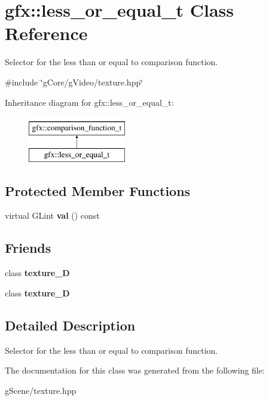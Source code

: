 \hypertarget{classgfx_1_1less__or__equal__t}{\section{gfx\-:\-:less\-\_\-or\-\_\-equal\-\_\-t Class Reference}
\label{classgfx_1_1less__or__equal__t}
}


Selector for the less than or equal to comparison function.  




{\ttfamily \#include \char`\"{}g\-Core/g\-Video/texture.\-hpp\char`\"{}}

Inheritance diagram for gfx\-:\-:less\-\_\-or\-\_\-equal\-\_\-t\-:\begin{figure}[H]
\begin{center}
\leavevmode
\includegraphics[height=2.000000cm]{classgfx_1_1less__or__equal__t}
\end{center}
\end{figure}
\subsection*{Protected Member Functions}
\begin{DoxyCompactItemize}
\item 
\hypertarget{classgfx_1_1less__or__equal__t_ab494c5a2a21f4d4777955e779447b058}{virtual G\-Lint {\bfseries val} () const }\label{classgfx_1_1less__or__equal__t_ab494c5a2a21f4d4777955e779447b058}

\end{DoxyCompactItemize}
\subsection*{Friends}
\begin{DoxyCompactItemize}
\item 
\hypertarget{classgfx_1_1less__or__equal__t_a2039d67f6166ccf823c78e3476aad9aa}{class {\bfseries texture\-\_\-D}}\label{classgfx_1_1less__or__equal__t_a2039d67f6166ccf823c78e3476aad9aa}

\item 
\hypertarget{classgfx_1_1less__or__equal__t_a22ad86ef46c3b17357a0cd59e50bc7dd}{class {\bfseries texture\-\_\-D}}\label{classgfx_1_1less__or__equal__t_a22ad86ef46c3b17357a0cd59e50bc7dd}

\end{DoxyCompactItemize}


\subsection{Detailed Description}
Selector for the less than or equal to comparison function. 

The documentation for this class was generated from the following file\-:\begin{DoxyCompactItemize}
\item 
g\-Scene/texture.\-hpp\end{DoxyCompactItemize}
